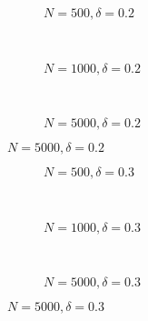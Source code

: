 \documentclass{beamer}
\begin{document}
\begin{frame}
\begin{figure}[h]
  \scriptsize
  \begingroup
  \centering
  \begin{subfigure}[b]{0.31\textwidth}
\caption{\footnotesize $N=500, \delta = 0.2$}
  
  \end{subfigure}
  ~
  \begin{subfigure}[b]{0.31\textwidth}
    \caption{\footnotesize $N=1000, \delta = 0.2$} 
  
  \end{subfigure}
  ~
  \begin{subfigure}[b]{0.31\textwidth}
\caption{\footnotesize $N=5000, \delta = 0.2$}
  
  \end{subfigure}
\endgroup
\end{figure}
\end{frame}
\begin{frame}
\begin{figure}[h]
  \scriptsize
  \begingroup
  \centering
  \begin{subfigure}[b]{0.31\textwidth}
\caption{\footnotesize $N=500, \delta = 0.3$}
  
  \end{subfigure}
  ~
  \begin{subfigure}[b]{0.31\textwidth}
    \caption{\footnotesize $N=1000, \delta = 0.3$} 
  
  \end{subfigure}
  ~
  \begin{subfigure}[b]{0.31\textwidth}
\caption{\footnotesize $N=5000, \delta = 0.3$}
  
  \end{subfigure}
\endgroup
\end{figure}
\end{frame}
\begin{frame}
  \begin{center}
    {}
  \end{center}
\end{frame}
\end{document}
